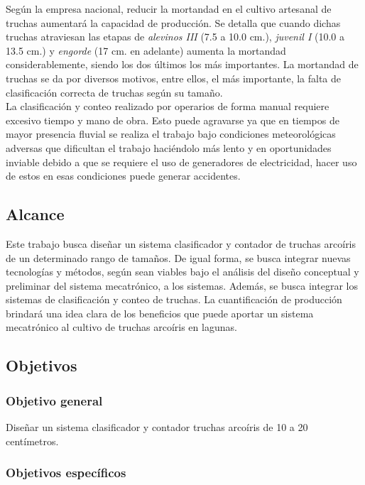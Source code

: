 Según la empresa nacional, reducir la mortandad en el cultivo artesanal de truchas aumentará la capacidad de producción. Se detalla que cuando dichas truchas atraviesan las etapas de \textit{alevinos III} (7.5 a 10.0 cm.), \textit{juvenil I} (10.0 a 13.5 cm.) y \textit{engorde} (17 cm. en adelante) aumenta la mortandad considerablemente, siendo los dos últimos los más importantes. La mortandad de truchas se da por diversos motivos, entre ellos, el más importante, la falta de clasificación correcta de truchas según su tamaño.\\
La clasificación y conteo realizado por operarios de forma manual requiere excesivo tiempo y mano de obra. Esto puede agravarse ya que en tiempos de mayor presencia fluvial se realiza el trabajo bajo condiciones meteorológicas adversas que dificultan el trabajo haciéndolo más lento y en oportunidades inviable debido a que se requiere el uso de generadores de electricidad, hacer uso de estos en esas condiciones puede generar accidentes. \\

\subsection{Alcance}
Este trabajo busca diseñar un sistema clasificador y contador de truchas arcoíris de un determinado rango de tamaños. De igual forma, se busca integrar nuevas tecnologías y métodos, según sean viables bajo el análisis del diseño conceptual y preliminar del sistema mecatrónico, a los sistemas. Además, se busca integrar los sistemas de clasificación y conteo de truchas.
La cuantificación de producción brindará una idea clara de los beneficios que puede aportar un sistema mecatrónico al cultivo de truchas arcoíris en lagunas. \\

\subsection{Objetivos}

\subsubsection{Objetivo general}

Diseñar un sistema clasificador y contador truchas arcoíris de 10 a 20 centímetros.

\subsubsection{Objetivos específicos}

